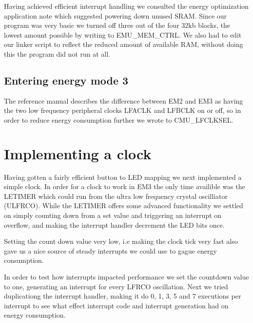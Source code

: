 Having achieved efficient interrupt handling we consulted the energy optimization application note which suggested powering down unused SRAM. Since our program was very basic we turned off three out of the four 32kb blocks, the lowest amount possible by writing to EMU\_MEM\_CTRL. We also had to edit our linker script to reflect the reduced amount of available RAM, without doing this the program did not run at all.

\subsection{Entering energy mode 3}

The reference manual describes the difference between EM2 and EM3 as having the two low frequency peripheral clocks LFACLK and LFBCLK on or off, so in order to reduce energy consumption further we wrote to CMU\_LFCLKSEL.

\section{Implementing a clock}

Having gotten a fairly efficient button to LED mapping we next implemented a simple clock. In order for a clock to work in EM3 the only time availible was the LETIMER which could run from the ultra low frequency crystal oscilliator (ULFRCO). While the LETIMER offers some advanced functionality we settled on simply counting down from a set value and triggering an interrupt on overflow, and making the interrupt handler decrement the LED bits once.

Setting the count down value very low, i.e making the clock tick very fast also gave us a nice source of steady interrupts we could use to gague energy consumption.

In order to test how interrupts impacted performance we set the countdown value to one, generating an interrupt for every LFRCO oscillation. Next we tried duplicationg the interrupt handler, making it do 0, 1, 3, 5 and 7 executions per interrupt to see what effect interrupt code and interrupt generation had on energy consumption.
